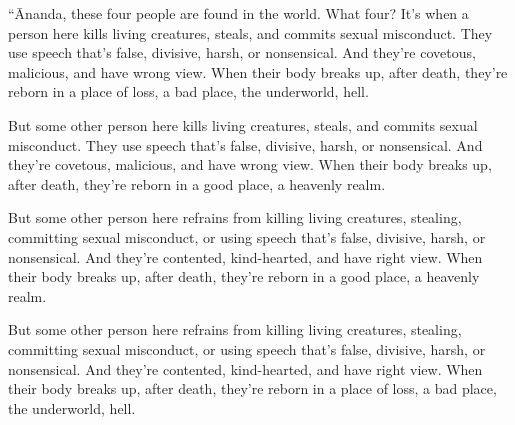 \documentclass[12pt,openany]{book}%
\begin{document}
“Ānanda, these four people are found in the world. What four? It’s when a person here kills living creatures, steals, and commits sexual misconduct. They use speech that’s false, divisive, harsh, or nonsensical. And they’re covetous, malicious, and have wrong view. When their body breaks up, after death, they’re reborn in a place of loss, a bad place, the underworld, hell. 

But some other person here kills living creatures, steals, and commits sexual misconduct. They use speech that’s false, divisive, harsh, or nonsensical. And they’re covetous, malicious, and have wrong view. When their body breaks up, after death, they’re reborn in a good place, a heavenly realm. 

But some other person here refrains from killing living creatures, stealing, committing sexual misconduct, or using speech that’s false, divisive, harsh, or nonsensical. And they’re contented, kind-hearted, and have right view. When their body breaks up, after death, they’re reborn in a good place, a heavenly realm. 

But some other person here refrains from killing living creatures, stealing, committing sexual misconduct, or using speech that’s false, divisive, harsh, or nonsensical. And they’re contented, kind-hearted, and have right view. When their body breaks up, after death, they’re reborn in a place of loss, a bad place, the underworld, hell. 
\end{document}
